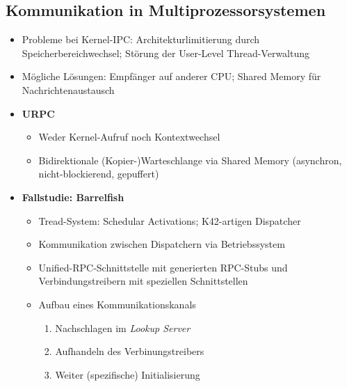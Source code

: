 \subsection{Kommunikation in Multiprozessorsystemen}
\begin{itemize}
	\item Probleme bei Kernel-IPC: Architekturlimitierung durch Speicherbereichwechsel; Störung der User-Level Thread-Verwaltung
	\item Mögliche Lösungen: Empfänger auf anderer CPU; Shared Memory für Nachrichtenaustausch
	\item \textbf{URPC}
	\begin{itemize}
		\item Weder Kernel-Aufruf noch Kontextwechsel
		\item Bidirektionale (Kopier-)Warteschlange via Shared Memory (asynchron, nicht-blockierend, gepuffert)
	\end{itemize}
	\item \textbf{Fallstudie: Barrelfish}
	\begin{itemize}
		\item Tread-System: Schedular Activations; K42-artigen Dispatcher
		\item Kommunikation zwischen Dispatchern via Betriebssystem
		\item Unified-RPC-Schnittstelle mit generierten RPC-Stubs und Verbindungstreibern mit speziellen Schnittstellen
		\item Aufbau eines Kommunikationskanals
		\begin{enumerate}
			\item Nachschlagen im \textit{Lookup Server}
			\item Aufhandeln des Verbinungstreibers
			\item Weiter (spezifische) Initialisierung
		\end{enumerate}
	\end{itemize}
\end{itemize}



















